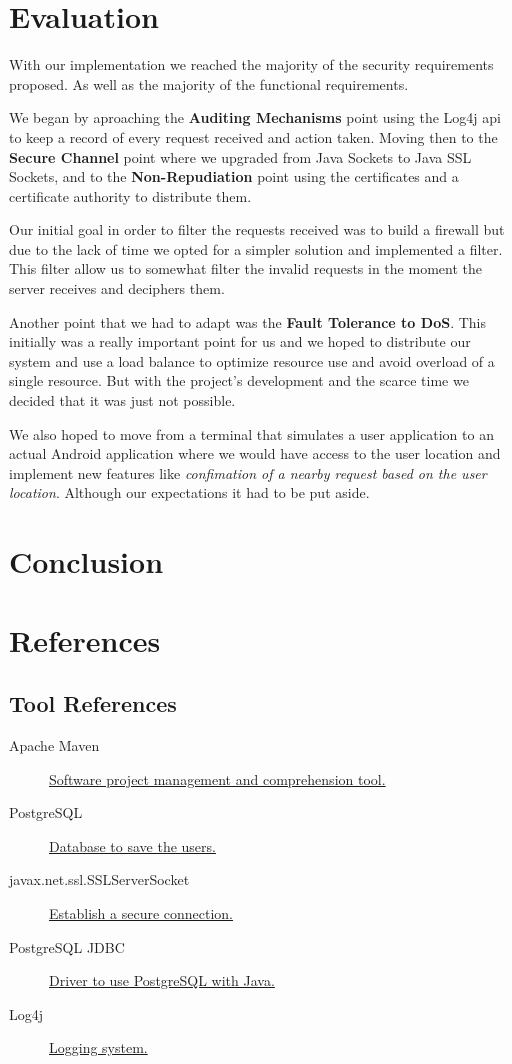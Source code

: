 \documentclass[a4paper,titlepage,11pt]{article}
\begin{document}
\section{Evaluation}
With our implementation we reached the majority of the security requirements proposed. As well as the majority of the
functional requirements.

We began by aproaching the \textbf{Auditing Mechanisms} point using the Log4j api to keep a record of every request received and
action taken. Moving then to the \textbf{Secure Channel} point where we upgraded from Java Sockets to Java SSL Sockets, and to the
\textbf{Non-Repudiation} point using the certificates and a certificate authority to distribute them.

Our initial goal in order to filter the requests received was to build a firewall but due to the lack of time we opted for a
simpler solution and implemented a filter. This filter allow us to somewhat filter the invalid requests in the moment the server
receives and deciphers them.

Another point that we had to adapt was the \textbf{Fault Tolerance to DoS}. This initially was a really important point for us and we
hoped to distribute our system and use a load balance to optimize resource use and avoid overload of a single resource. But with the
project's development and the scarce time we decided that it was just not possible.

We also hoped to move from a terminal that simulates a user application to an actual Android application where we would have access to
the user location and implement new features like \textit{confimation of a nearby request based on the user location}. Although our
expectations it had to be put aside.

\section{Conclusion}

\section{References}

\subsection{Tool References}
\begin{description}
  \item [Apache Maven] \href{https://maven.apache.org}{Software project management and comprehension tool.}
  \item [PostgreSQL] \href{https://www.postgresql.org}{Database to save the users.}
  \item [javax.net.ssl.SSLServerSocket] \href{https://docs.oracle.com/javase/7/docs/api/java/net/Socket.html}{Establish a secure connection.}
  \item [PostgreSQL JDBC] \href{https://jdbc.postgresql.org}{Driver to use PostgreSQL with Java.}
  \item [Log4j] \href{http://logging.apache.org/log4j/2.x/}{Logging system.}
\end{description}
\end{document}
